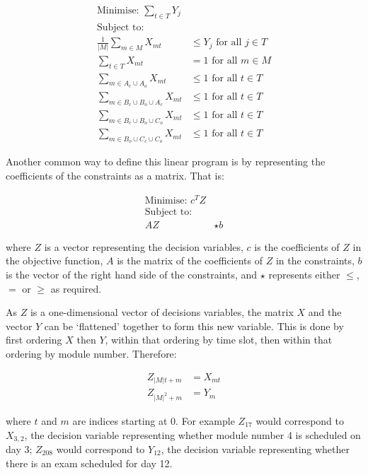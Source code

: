\begin{align}
\text{Minimise: } \sum_{t \in T} Y_j & \label{eqn:objective_modules} \\
\text{Subject to: } & \nonumber \\
\frac{1}{|M|} \sum_{m \in M} X_{mt} &\leq Y_j \text{ for all } j \in T \label{eqn:auxiliary} \\
\sum_{t \in T} X_{mt} &= 1 \text{ for all } m \in M \label{eqn:schedule_all_modules} \\
\sum_{m \in A_c \cup A_o} X_{mt} &\leq 1 \text{ for all } t \in T \label{eqn:clique1} \\
\sum_{m \in B_c \cup B_o \cup A_c} X_{mt} &\leq 1 \text{ for all } t \in T \label{eqn:clique2} \\
\sum_{m \in B_c \cup B_o \cup C_o} X_{mt} &\leq 1 \text{ for all } t \in T \label{eqn:clique3} \\
\sum_{m \in B_o \cup C_c \cup C_o} X_{mt} &\leq 1 \text{ for all } t \in T \label{eqn:clique4}
\end{align}

Another common way to define this linear program is by representing the
coefficients of the constraints as a matrix.
That is:

\begin{align}
\text{Minimise: } c^T Z & \\
\text{Subject to: } & \nonumber \\
A Z & \star b
\end{align}

where \(Z\) is a vector representing the decision variables, \(c\) is the
coefficients of \(Z\) in the objective function, \(A\) is the matrix of the
coefficients of \(Z\) in the constraints, \(b\) is the vector of the right hand
side of the constraints, and \(\star\) represents either \(\leq\), \(=\) or
\(\geq\) as required.

As \(Z\) is a one-dimensional vector of decisions variables,
the matrix \(X\) and the vector \(Y\) can be `flattened' together to form this new variable.
This is done by first ordering \(X\) then \(Y\), within that
ordering by time slot, then within that ordering by module number.
Therefore:

\begin{align}
Z_{|M|t + m} &= X_{mt}\\
Z_{|M|^2 + m} &= Y_m
\end{align}

where \(t\) and \(m\) are indices starting at 0.
For example \(Z_{17}\) would correspond to \(X_{3, 2}\), the decision variable
representing whether module number 4 is scheduled on day 3; \(Z_{208}\) would
correspond to \(Y_{12}\), the decision variable representing whether there is an
exam scheduled for day 12.

